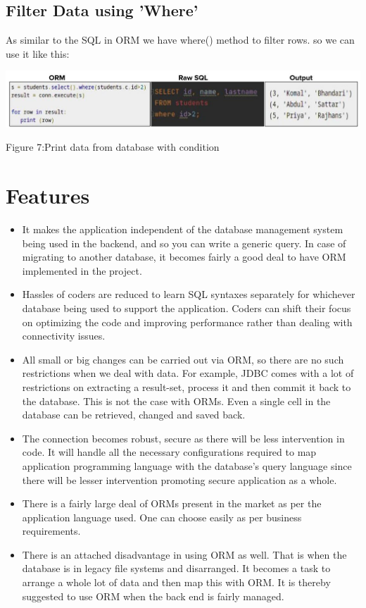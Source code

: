 \documentclass[10pt,a4paper,twoside]{article}
\begin{document}
\subsection{Filter Data using 'Where'}
As similar to the SQL in ORM we have where() method to filter rows. so we can use it like this:
\item
\begin{figure7}
  \includegraphics[width=\linewidth]{./images/where.jpg}
  \caption{ Figure 7:Print data from database with condition}
  \label{fig:Print data from database with condition (ORM vs SQL)}
\end{figure7}


\section{Features}
\begin{itemize}
\item It makes the application independent of the database management system being used in the backend, and so you can write a generic query. In case of migrating to another database, it becomes fairly a good deal to have ORM implemented in the project.
\item Hassles of coders are reduced to learn SQL syntaxes separately for whichever database being used to support the application. Coders can shift their focus on optimizing the code and improving performance rather than dealing with connectivity issues.
\item All small or big changes can be carried out via ORM, so there are no such restrictions when we deal with data. For example, JDBC comes with a lot of restrictions on extracting a result-set, process it and then commit it back to the database. This is not the case with ORMs. Even a single cell in the database can be retrieved, changed and saved back.
\item The connection becomes robust, secure as there will be less intervention in code. It will handle all the necessary configurations required to map application programming language with the database’s query language since there will be lesser intervention promoting secure application as a whole.
\item There is a fairly large deal of ORMs present in the market as per the application language used. One can choose easily as per business requirements.
\item There is an attached disadvantage in using ORM as well. That is when the database is in legacy file systems and disarranged. It becomes a task to arrange a whole lot of data and then map this with ORM. It is thereby suggested to use ORM when the back end is fairly managed.
\end{itemize}
\end{document}
